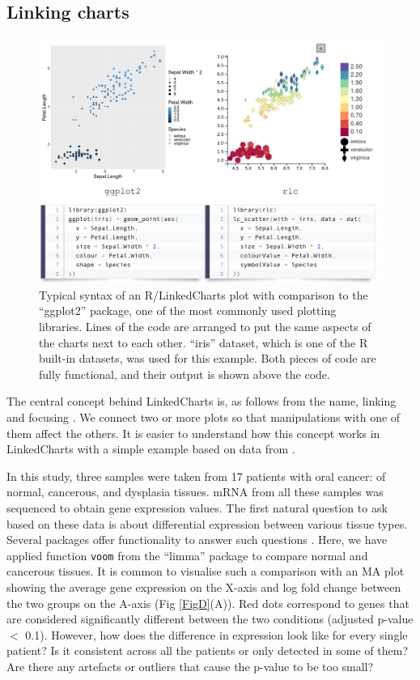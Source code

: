 \documentclass[twocolumn,10pt]{article}
\begin{document}
\subsection{Linking charts}

\begin{figure}[t]
	\includegraphics[width=\textwidth]{FigB/figB.png}
	\caption{Typical syntax of an R/LinkedCharts plot with comparison to the ``ggplot2'' \citep{wickham_2016} package, one of the most commonly used plotting libraries. Lines of the code are arranged to put the same aspects of the charts next to each other. ``iris'' dataset, which is one of the R built-in datasets, was used for this example. Both pieces of code are fully functional, and their output is shown above the code.}
	\label{FigB}
\end{figure}

The central concept behind LinkedCharts is, as follows from the name, linking and focusing \citep{buja_1991}. We connect two or more plots so that manipulations with one of them affect the others. It is easier to understand how this concept works in LinkedCharts with a simple example based on data from \citet{conway_2015}.

In this study, three samples were taken from 17 patients with oral cancer: of normal, cancerous, and dysplasia tissues. mRNA from all these samples was sequenced to obtain gene expression values. The first natural question to ask based on these data is about differential expression between various tissue types. Several packages offer functionality to answer such questions  \citep{ritchie_2015, love_2014}. Here, we have applied function \texttt{voom} from the ``limma'' package to compare normal and cancerous tissues. It is common to visualise such a comparison with an MA plot \citep{dudoit_2002} showing the average gene expression on the X-axis and log fold change between the two groups on the A-axis (Fig \ref{FigD}(A)). Red dots correspond to genes that are considered significantly different between the two conditions (adjusted p-value $<$ 0.1). However, how does the difference in expression look like for every single patient? Is it consistent across all the patients or only detected in some of them? Are there any artefacts or outliers that cause the p-value to be too small?
\end{document}
